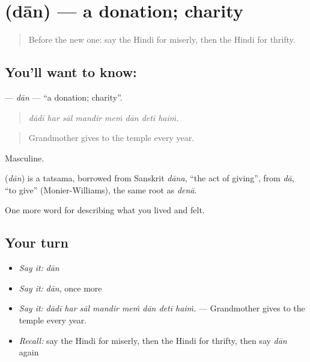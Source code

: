 \section[\texorpdfstring{\hi{दान} (dān)}{दान (dān)}]{ (dān) — a donation; charity}

\label{lesson:HI-C469-dan}



\begin{quote}
Before the new one: say the Hindi for miserly, then the Hindi for thrifty.
\end{quote}

\subsection*{You'll want to know: }
\textbf{} — \emph{dān} — \textquotedblleft{}a donation; charity\textquotedblright{}.

\begin{quote}
       
\end{quote}

\begin{quote}
\emph{dādī har sāl mandir meṁ dān detī haiṁ.}
\end{quote}

\begin{quote}
Grandmother gives to the temple every year.
\end{quote}

Masculine.

\begin{cousinweb}
\textbf{} (\emph{dān}) is a tatsama, borrowed from Sanskrit \emph{dāna}, \textquotedblleft{}the act of giving\textquotedblright{}, from \emph{dā}, \textquotedblleft{}to give\textquotedblright{} (Monier-Williams), the same root as \emph{denā}.
\end{cousinweb}

\begin{grammarlens}[title={What you've built}]
One more word for describing what you lived and felt.
\end{grammarlens}

\subsection*{Your turn}
\begin{itemize}
\raggedright
  \item \emph{Say it:} \emph{dān}
  \item \emph{Say it:} \emph{dān}, once more
  \item \emph{Say it:} \emph{dādī har sāl mandir meṁ dān detī haiṁ.} — Grandmother gives to the temple every year.
  \item \emph{Recall:} say the Hindi for miserly, then the Hindi for thrifty, then say \emph{dān} again
\end{itemize}

